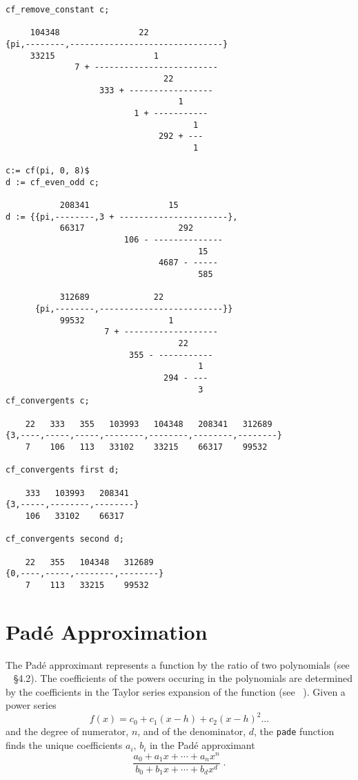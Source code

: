 \documentclass[11pt,a4paper]{article}
\begin{document}
\begin{verbatim}
cf_remove_constant c;

     104348                22
{pi,--------,-------------------------------}
     33215                    1
              7 + -------------------------
                                22
                   333 + -----------------
                                   1
                          1 + -----------
                                      1
                               292 + ---
                                      1

c:= cf(pi, 0, 8)$
d := cf_even_odd c;

           208341                15
d := {{pi,--------,3 + ----------------------},
           66317                   292
                        106 - --------------
                                       15
                               4687 - -----
                                       585

           312689             22
      {pi,--------,-------------------------}}
           99532                 1
                    7 + -------------------
                                   22
                         355 - -----------
                                       1
                                294 - ---
                                       3
cf_convergents c;

    22   333   355   103993   104348   208341   312689
{3,----,-----,-----,--------,--------,--------,--------}
    7    106   113   33102    33215    66317    99532

cf_convergents first d;

    333   103993   208341
{3,-----,--------,--------}
    106   33102    66317

cf_convergents second d;

    22   355   104348   312689
{0,----,-----,--------,--------}
    7    113   33215    99532
\end{verbatim}

\section{Pad\'{e} Approximation}

The Pad\'{e} approximant represents a function by the ratio of two 
polynomials (see ~\cite{PA} \S 4.2). The coefficients of the powers occuring
in the polynomials 
are determined by the coefficients in the Taylor series
expansion of the function (see ~\cite{PA}). Given a power series
\[ f(x) = c_0 + c_1 (x-h) + c_2 (x-h)^2 \ldots \]
and the degree of numerator, $n$, and of the denominator, $d$,
the \texttt{pade} function finds the unique coefficients 
$a_i,\, b_i$ in the Pad\'{e} approximant 
\[ \frac{a_0+a_1 x+ \cdots + a_n x^n}{b_0+b_1 x+ \cdots + b_d x^d} \; .\]
\end{document}
